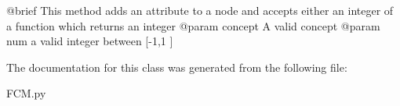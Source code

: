\begin{DoxyVerb}@brief This method adds an attribute to a node and accepts either an integer of a function which returns an integer
@param concept A valid concept
@param num a valid integer between [-1,1 ]
\end{DoxyVerb}
 

The documentation for this class was generated from the following file\+:\begin{DoxyCompactItemize}
\item 
F\+C\+M.\+py\end{DoxyCompactItemize}
